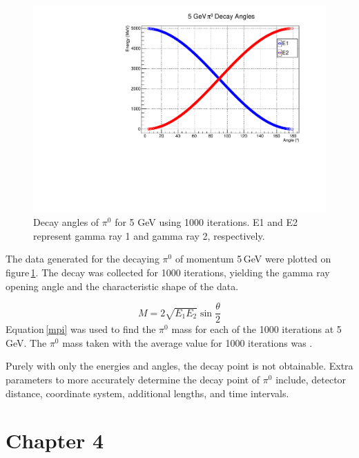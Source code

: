 \documentclass[aps,prl,twocolumn,superscriptaddress,nofootinbib]{revtex4-1}
\begin{document}
\begin{figure}[h!]
\begin{center}
\centerline{\includegraphics[width=3.in]{decayangles5gev.pdf}}
\caption{ \small{Decay angles of $\pi^0$ for 5 GeV using 1000 iterations. E1 and E2 represent gamma ray 1 and gamma ray 2, respectively. \label{relkinmodel}}}
\end{center}
\end{figure}

The data generated for the decaying $\pi^0$ of momentum 5\,GeV were plotted on figure\,\ref{relkinmodel}. The decay was collected for 1000 iterations, yielding the gamma ray opening angle and the characteristic shape of the data.

\begin{equation}
M=2\sqrt{E_1E_2}\sin\frac{\theta}{2}
\label{mpi}
\end{equation}
Equation\,\ref{mpi} was used to find the $\pi^0$ mass for each of the 1000 iterations at 5\,GeV. The $\pi^0$ mass taken with the average value for 1000 iterations was .


\indent Purely with only the energies and angles, the decay point is not obtainable. Extra parameters to more accurately determine the decay point of $\pi^0$ include, detector distance, coordinate system, additional lengths, and time intervals.



\clearpage









\section{Chapter 4}
\end{document}
